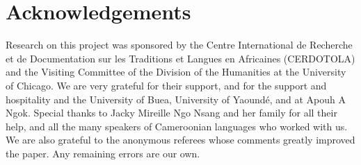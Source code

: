 \documentclass[output=paper
,newtxmath
,modfonts
,nonflat]{langsci/langscibook}
\begin{document}
\section*{Acknowledgements}

Research on this project was sponsored by the Centre International de Recherche et de Documentation sur les Traditions et Langues en Africaines (CERDOTOLA) and the Visiting Committee of the Division of the Humanities at the University of Chicago. We are very grateful for their support, and for the support and hospitality and the University of Buea,  University of Yaound\'{e}, and at Apouh A Ngok. Special thanks to Jacky Mireille Ngo Nsang and her family for all their help, and all the many speakers of Cameroonian languages who worked with us. We are also grateful to the anonymous referees whose comments greatly improved the paper. Any remaining errors are our own.

\sloppy
\printbibliography[heading=subbibliography,notkeyword=this]
\end{document}
